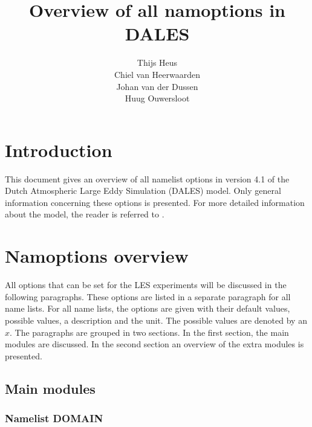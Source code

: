 \documentclass[twoside,11pt,fleqn,a4paper,english,openright]{report}
\begin{document}
 \begin{titlepage}
  \title{\textbf{Overview of all namoptions in DALES}}
  \author{Thijs Heus \\
  Chiel van Heerwaarden \\
  Johan van der Dussen \\
  Huug Ouwersloot}
  \maketitle
 \end{titlepage}
\thispagestyle{empty}

\tableofcontents
{}
\chapter{Introduction}\label{chapter:introduction}

\setcounter{page}{1}
This document gives an overview of all namelist options in version 4.1 of the Dutch Atmospheric Large Eddy Simulation (DALES) model. Only general information concerning these options is presented. For more detailed information about the model, the reader is referred to \citet{Heus2009}. 

\chapter{Namoptions overview}\label{chapter:namoptions}

All options that can be set for the LES experiments will be discussed in the following paragraphs. These options are listed in a separate paragraph for all name lists. For all name lists, the options are given with their default values, possible values, a description and the unit. The possible values are denoted by an $x$. The paragraphs are grouped in two sections. In the first section, the main modules are discussed. In the second section an overview of the extra modules is presented.

\section{Main modules}\label{par:mainmod}

\subsection{Namelist DOMAIN}\label{par:domain}
\end{document}
